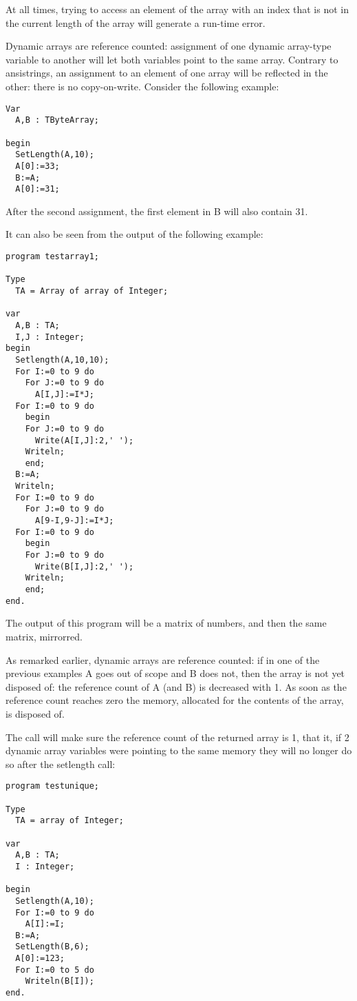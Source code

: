 At all times, trying to access an element of the array with an index 
that is not in the current length of the array will generate a run-time 
error.

Dynamic arrays are reference counted: assignment of one dynamic array-type 
variable to another will let both variables point to the same array. 
Contrary to ansistrings, an assignment to an element of one array will 
be reflected in the other: there is no copy-on-write. Consider the following
example:
\begin{verbatim}
Var
  A,B : TByteArray;

begin
  SetLength(A,10);
  A[0]:=33;
  B:=A;
  A[0]:=31;
\end{verbatim}
After the second assignment, the first element in B will also contain 31.

It can also be seen from the output of the following example:
\begin{verbatim}
program testarray1;

Type
  TA = Array of array of Integer;
  
var   
  A,B : TA;
  I,J : Integer;
begin
  Setlength(A,10,10);
  For I:=0 to 9 do
    For J:=0 to 9 do 
      A[I,J]:=I*J;
  For I:=0 to 9 do
    begin
    For J:=0 to 9 do 
      Write(A[I,J]:2,' ');
    Writeln;
    end;
  B:=A;
  Writeln;
  For I:=0 to 9 do
    For J:=0 to 9 do 
      A[9-I,9-J]:=I*J;
  For I:=0 to 9 do
    begin
    For J:=0 to 9 do 
      Write(B[I,J]:2,' ');
    Writeln;
    end;
end.  
\end{verbatim}
The output of this program will be a matrix of numbers, and then the same matrix, mirrorred.

As remarked earlier, dynamic arrays are reference counted: if in one of the previous examples A
goes out of  scope and B does not, then the array is not yet disposed of: the
reference count of A (and B) is decreased with 1. As soon as the reference
count reaches zero the memory, allocated for the contents of the array, is disposed of.

The  call will make sure the reference count of the returned
array is 1, that it, if 2 dynamic array variables were pointing to the same
memory they will no longer do so after the setlength call:
\begin{verbatim}
program testunique;

Type
  TA = array of Integer;
  
var   
  A,B : TA;
  I : Integer;

begin
  Setlength(A,10);
  For I:=0 to 9 do
    A[I]:=I;
  B:=A;
  SetLength(B,6);    
  A[0]:=123;
  For I:=0 to 5 do
    Writeln(B[I]);
end.  
\end{verbatim}

